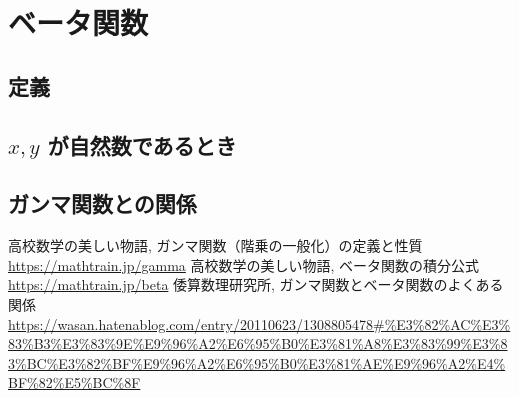 \documentclass[a4paper,12pt,uplatex,dvipdfmx]{jsarticle}
\begin{document}
\section{ベータ関数}
\subsection{定義}
\subsection{$x, y$ が自然数であるとき}
\subsection{ガンマ関数との関係}

\begin{thebibliography}{9}
    高校数学の美しい物語, ガンマ関数（階乗の一般化）の定義と性質 \\
    \url{https://mathtrain.jp/gamma}
    高校数学の美しい物語, ベータ関数の積分公式 \\
    \url{https://mathtrain.jp/beta}
    倭算数理研究所, ガンマ関数とベータ関数のよくある関係 \\
    \url{https://wasan.hatenablog.com/entry/20110623/1308805478#%E3%82%AC%E3%83%B3%E3%83%9E%E9%96%A2%E6%95%B0%E3%81%A8%E3%83%99%E3%83%BC%E3%82%BF%E9%96%A2%E6%95%B0%E3%81%AE%E9%96%A2%E4%BF%82%E5%BC%8F}
\end{thebibliography}
\end{document}
